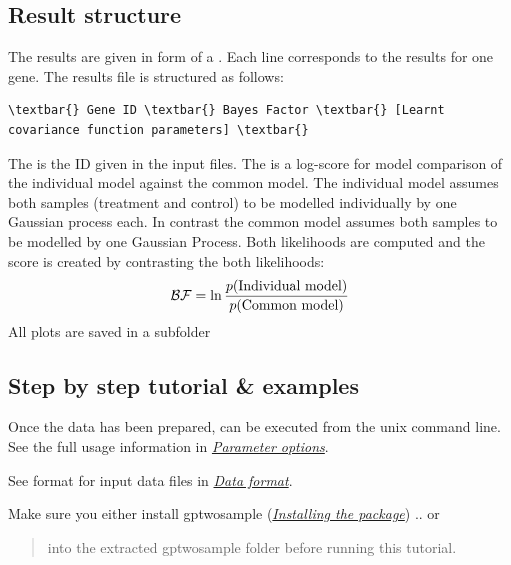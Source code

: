 \documentclass[letterpaper,10pt,english]{sphinxmanual}
\begin{document}
\subsection{Result structure}
\label{results:result-structure}\label{results::doc}\label{results:results}
The results are given in form of a . Each line corresponds to the results for one gene. The results file is structured as follows:

\begin{Verbatim}[commandchars=\\\{\}]
\textbar{} Gene ID \textbar{} Bayes Factor \textbar{} [Learnt covariance function parameters] \textbar{}
\end{Verbatim}

The  is the ID given in the input files. The  is a log-score for model comparison of the individual model against the common model. The individual model assumes both samples (treatment and control) to be modelled individually by one Gaussian process each. In contrast the common model assumes both samples to be modelled by one Gaussian Process. Both likelihoods are computed and the score is created by contrasting the both likelihoods:
\begin{gather}
\begin{split}\mathcal{BF} = \ln \frac{p(\text{Individual model})}{p(\text{Common model})}\end{split}\notag
\end{gather}
All plots are saved in a subfolder 


\subsection{Step by step tutorial \& examples}
\label{tutorial:step-by-step-tutorial-examples}\label{tutorial::doc}
Once the data has been prepared,  can be executed from
the unix command line. See the full usage information in {\hyperref[usage:usage]{\emph{Parameter options}}}.

See format for input data  files in {\hyperref[usage:dataformat]{\emph{Data format}}}.

Make sure you either install gptwosample ({\hyperref[tutorial:install]{\emph{Installing the package}}})
.. or 
\begin{quote}

into the extracted gptwosample folder before running this tutorial.
\end{quote}
\end{document}
